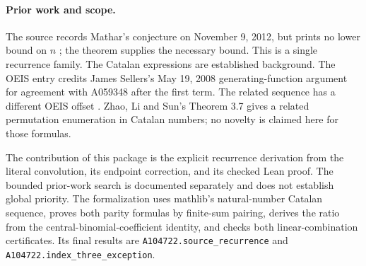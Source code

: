 \paragraph{Prior work and scope.}
The source records Mathar's conjecture on November 9, 2012, but
prints no lower bound on $n$ \cite{a104722-source}; the theorem
supplies the necessary bound. This is a single recurrence family.
The Catalan expressions are established background. The OEIS
entry credits James Sellers's May 19, 2008 generating-function
argument for agreement with A059348 after the first term.
The related sequence has a different OEIS offset
\cite{a104722-related}. Zhao, Li and Sun's Theorem 3.7
\cite{a104722-zhao} gives a related permutation enumeration in
Catalan numbers; no novelty is claimed here for those formulas.

The contribution of this package is the explicit recurrence
derivation from the literal convolution, its endpoint correction,
and its checked Lean proof. The bounded prior-work search is
documented separately and does not establish global priority.
The formalization uses mathlib's natural-number Catalan sequence,
proves both parity formulas by finite-sum pairing, derives the ratio
from the central-binomial-coefficient identity, and checks both
linear-combination certificates. Its final results are
\texttt{A104722.source\_recurrence} and
\texttt{A104722.index\_three\_exception}.
